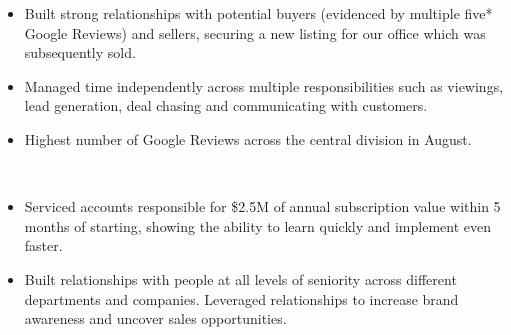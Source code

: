 \documentclass[10pt,a4paper,ragged2e]{altacv}
\begin{document}
\begin{itemize}
\item Built strong relationships with potential buyers (evidenced by multiple five* Google Reviews) and sellers, securing a new listing for our office which was subsequently sold.
\item Managed time independently across multiple responsibilities such as viewings, lead generation, deal chasing and communicating with customers. 
\item Highest number of Google Reviews across the central division in August. 
\smallskip
\end{itemize}
\divider \\
\begin{itemize}
\item Serviced accounts responsible for \$2.5M of annual subscription value within 5 months of starting, showing the ability to learn quickly and implement even faster. 
\smallskip
\item Built relationships with people at all levels of seniority across different departments and companies. Leveraged relationships to increase brand awareness and uncover sales opportunities. 
\end{itemize}

\clearpage
\end{document}
